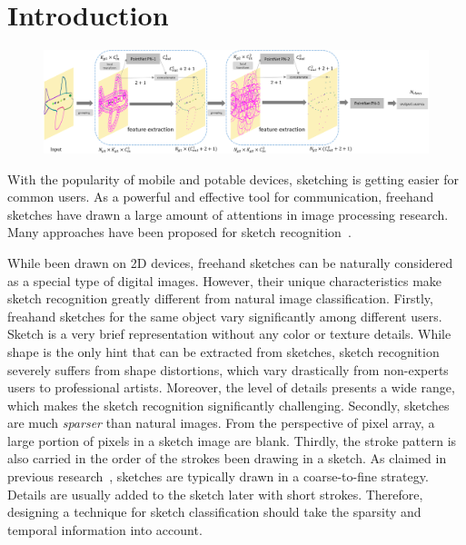 \section{Introduction}
\label{sec:intro}

\begin{figure}
    \center
    \includegraphics[width=7in]{images/sketchpointnet.png}
    \label{fig:sketchpointnet}
\end{figure}

With the popularity of mobile and potable devices, sketching is getting easier for common users. As a powerful and effective tool for communication, freehand sketches have drawn a large amount of attentions in image processing research.
Many approaches have been proposed for sketch recognition~\cite{Eitz2012HowDH, LiHSG15, Schneider2014SketchCA, Yu2015SketchaNetTB, Seddati2015DeepSketchDC, Dupont2016DeepSketch2D}.


While been drawn on 2D devices, freehand sketches can be naturally considered as a special type of digital images.
However, their unique characteristics make sketch recognition greatly different from natural image classification.
%
Firstly, freahand sketches for the same object vary significantly among different users.
Sketch is a very brief representation without any color or texture details.
%
While shape is the only hint that can be extracted from sketches, sketch recognition severely suffers from shape distortions, which vary drastically from non-experts users to professional artists.
Moreover, the level of details presents a wide range, which makes the sketch recognition significantly challenging.
%
Secondly, sketches are much \emph{sparser} than natural images.
From the perspective of pixel array, a large portion of pixels in a sketch image are blank.
Thirdly, the stroke pattern is also carried in the order of the strokes been drawing in a sketch. As claimed in previous research~\cite{Eitz2012HowDH}, sketches are typically drawn in a coarse-to-fine strategy. Details are usually added to the sketch later with short strokes.
Therefore, designing a technique for sketch classification should take the sparsity and temporal information into account.



